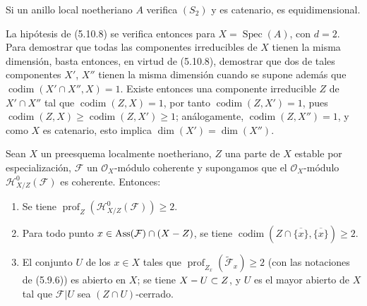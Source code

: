 \begin{corollary}[5.10.9]
\label{IV.2.s5.10.9-fr}
Si un anillo local noetheriano $A$ verifica $(S_2)$ y es catenario, es
equidimensional.
\end{corollary}

La hipótesis de (5.10.8) se verifica entonces para
$X=\operatorname{Spec}(A)$, con $d=2$. Para demostrar que todas las
componentes irreducibles de $X$ tienen la misma dimensión, basta entonces, en
virtud de (5.10.8), demostrar que dos de tales componentes $X'$, $X''$ tienen
la misma dimensión cuando se supone además que
$\operatorname{codim}(X'\cap X'',X)=1$. Existe entonces una componente
irreducible $Z$ de $X'\cap X''$ tal que
$\operatorname{codim}(Z,X)=1$, por tanto $\operatorname{codim}(Z,X')=1$, pues
$\operatorname{codim}(Z,X)\geq\operatorname{codim}(Z,X')\geq1$; análogamente,
$\operatorname{codim}(Z,X'')=1$, y como $X$ es catenario, esto implica
$\dim(X')=\dim(X'')$.

\begin{proposition}[5.10.10]
\label{IV.2.s5.10.10-fr}
Sean $X$ un preesquema localmente noetheriano, $Z$ una parte de $X$ estable
por especialización, $\mathcal F$ un $\mathcal O_X$-módulo coherente y
supongamos que el $\mathcal O_X$-módulo
$\mathcal H^0_{X/Z}(\mathcal F)$ es coherente. Entonces:
\begin{enumerate}
\item[\textup{(i)}] Se tiene
$\operatorname{prof}_Z(\mathcal H^0_{X/Z}(\mathcal F))\geq2$.
\item[\textup{(ii)}] Para todo punto
$x\in\operatorname{Ass}(\mathcal F)\cap(X- Z)$, se tiene
$\operatorname{codim}(Z\cap\overline{\{x\}},\overline{\{x\}})\geq2$.
\item[\textup{(iii)}] El conjunto $U$ de los $x\in X$ tales que
$\operatorname{prof}_{Z_x}(\widetilde{\mathcal F}_x)\geq2$ \textup{(con las notaciones
de (5.9.6))} es abierto en $X$; se tiene $X- U\subset Z$, y $U$ es el mayor
abierto de $X$ tal que $\mathcal F|U$ sea $(Z\cap U)$-cerrado.
\end{enumerate}
\end{proposition}


